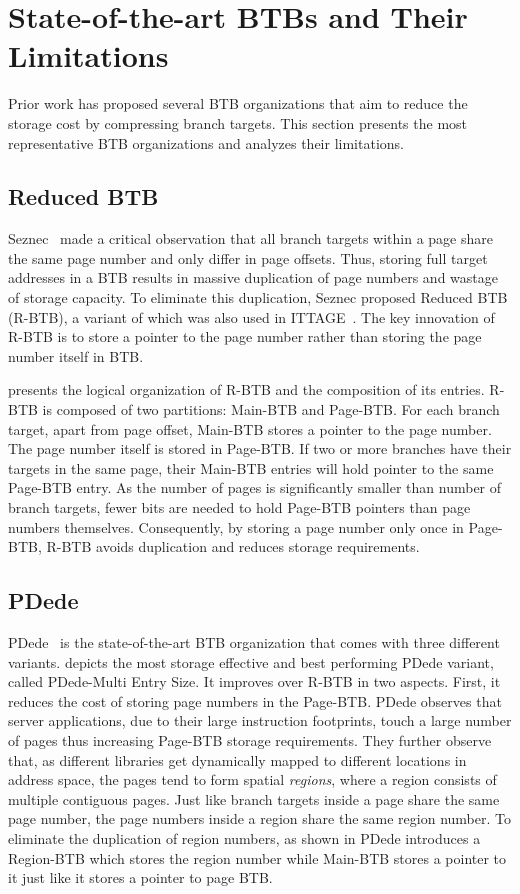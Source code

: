 \section{State-of-the-art BTBs and Their Limitations}
\label{sec:btbOrgs}

Prior work has proposed several BTB organizations that aim to reduce the storage cost by compressing branch targets. This section presents the most representative BTB organizations and analyzes their limitations.

\subsection{Reduced BTB} Seznec~\cite{DUPN} made a critical observation that all branch targets within a page share the same page number and only differ in page offsets. Thus, storing full target addresses in a BTB results in massive duplication of page numbers and wastage of storage capacity. To eliminate this duplication, Seznec proposed Reduced BTB (R-BTB), a variant of which was also used in ITTAGE~\cite{ittage}. The key innovation of R-BTB is to store a pointer to the page number rather than storing the page number itself in BTB. 

 presents the logical organization of R-BTB and the composition of its entries. R-BTB is composed of two partitions: Main-BTB and Page-BTB. For each branch target, apart from page offset, Main-BTB stores a pointer to the page number. The page number itself is stored in Page-BTB. If two or more branches have their targets in the same page, their Main-BTB entries will hold pointer to the same Page-BTB entry. As the number of pages is significantly smaller than number of branch targets, fewer bits are needed to hold Page-BTB pointers than page numbers themselves. Consequently, by storing a page number only once in Page-BTB, R-BTB avoids duplication and reduces storage requirements. 

\subsection{PDede}
\label{sec:pdedearch}
PDede~\cite{pdede} is the state-of-the-art BTB organization that comes with three different variants.  depicts the most storage effective and best performing PDede variant, called PDede-Multi Entry Size. It improves over R-BTB in two aspects. First, it reduces the cost of storing page numbers in the Page-BTB. PDede observes that server applications, due to their large instruction footprints, touch a large number of pages thus increasing Page-BTB storage requirements. They further observe that, as different libraries get dynamically mapped to different locations in address space,  the pages tend to form spatial \emph{regions}, where a region consists of multiple contiguous pages. Just like branch targets inside a page share the same page number, the page numbers inside a region share the same region number. To eliminate the duplication of region numbers, as shown in  PDede introduces a Region-BTB which stores the region number while Main-BTB stores a pointer to it just like it stores a pointer to page BTB. 

